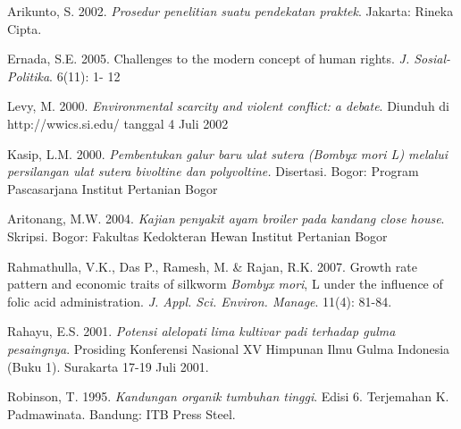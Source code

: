 Arikunto, S. 2002. \textit{Prosedur penelitian suatu pendekatan praktek}. Jakarta: Rineka Cipta.

Ernada, S.E. 2005. Challenges to the modern concept of human rights. \textit{J. Sosial-Politika}. 6(11): 1- 12

Levy, M. 2000. \textit{Environmental scarcity and violent conflict: a debate}. Diunduh di http://wwics.si.edu/ tanggal 4 Juli 2002

Kasip, L.M. 2000. \textit{Pembentukan galur baru ulat sutera (Bombyx mori L) melalui persilangan ulat sutera bivoltine dan polyvoltine.} Disertasi. Bogor: Program Pascasarjana Institut Pertanian Bogor 

Aritonang, M.W. 2004. \textit{Kajian penyakit ayam broiler pada kandang close house}. Skripsi. Bogor: Fakultas Kedokteran Hewan Institut Pertanian Bogor

Rahmathulla, V.K., Das P., Ramesh, M. \& Rajan, R.K. 2007. Growth rate pattern and economic traits of silkworm \textit{Bombyx mori}, L under the influence of folic acid administration. \textit{J. Appl. Sci. Environ. Manage}. 11(4): 81-84.

Rahayu, E.S. 2001. \textit{Potensi alelopati lima kultivar padi terhadap gulma pesaingnya}. Prosiding Konferensi Nasional XV Himpunan Ilmu Gulma Indonesia (Buku 1). Surakarta 17-19 Juli 2001.

Robinson, T. 1995. \textit{Kandungan organik tumbuhan tinggi}. Edisi 6. Terjemahan K. Padmawinata. Bandung: ITB Press Steel.